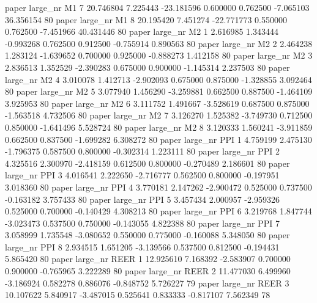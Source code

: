       paper   large_nr       M1                 7 20.746804  7.225443 -23.181596 0.600000 0.762500 -7.065103   36.356154 80
       paper   large_nr       M1                 8 20.195420  7.451274 -22.771773 0.550000 0.762500 -7.451966   40.431446 80
       paper   large_nr       M2                 1  2.616985  1.343444  -0.993268 0.762500 0.912500 -0.755914    0.890563 80
       paper   large_nr       M2                 2  2.464238  1.283124  -1.639652 0.700000 0.925000 -0.888273    1.412158 80
       paper   large_nr       M2                 3  2.836513  1.352529  -2.390283 0.675000 0.900000 -1.145314    2.237503 80
       paper   large_nr       M2                 4  3.010078  1.412713  -2.902093 0.675000 0.875000 -1.328855    3.092464 80
       paper   large_nr       M2                 5  3.077940  1.456290  -3.259881 0.662500 0.887500 -1.464109    3.925953 80
       paper   large_nr       M2                 6  3.111752  1.491667  -3.528619 0.687500 0.875000 -1.563518    4.732506 80
       paper   large_nr       M2                 7  3.126270  1.525382  -3.749730 0.712500 0.850000 -1.641496    5.528724 80
       paper   large_nr       M2                 8  3.120333  1.560241  -3.911859 0.662500 0.837500 -1.699282    6.308272 80
       paper   large_nr      PPI                 1  4.759199  2.475130  -1.796375 0.587500 0.800000 -0.302314    1.223111 80
       paper   large_nr      PPI                 2  4.325516  2.300970  -2.418159 0.612500 0.800000 -0.270489    2.186601 80
       paper   large_nr      PPI                 3  4.016541  2.222650  -2.716777 0.562500 0.800000 -0.197951    3.018360 80
       paper   large_nr      PPI                 4  3.770181  2.147262  -2.900472 0.525000 0.737500 -0.163182    3.757433 80
       paper   large_nr      PPI                 5  3.457434  2.000957  -2.959326 0.525000 0.700000 -0.140429    4.308213 80
       paper   large_nr      PPI                 6  3.219768  1.847744  -3.023473 0.537500 0.750000 -0.143055    4.822388 80
       paper   large_nr      PPI                 7  3.058999  1.735548  -3.080652 0.550000 0.775000 -0.160088    5.348050 80
       paper   large_nr      PPI                 8  2.934515  1.651205  -3.139566 0.537500 0.812500 -0.194431    5.865420 80
       paper   large_nr     REER                 1 12.925610  7.168392  -2.583907 0.700000 0.900000 -0.765965    3.222289 80
       paper   large_nr     REER                 2 11.477030  6.499960  -3.186924 0.582278 0.886076 -0.848752    5.726227 79
       paper   large_nr     REER                 3 10.107622  5.840917  -3.487015 0.525641 0.833333 -0.817107    7.562349 78
